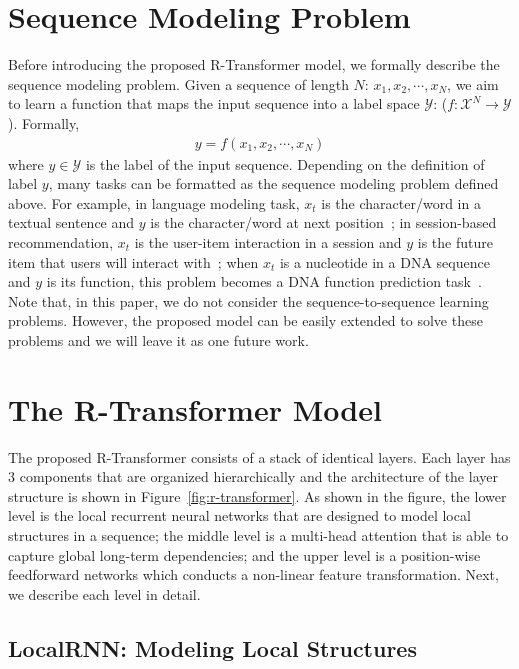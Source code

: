 \documentclass{article} \usepackage{iclr2019_conference,times}
\begin{document}
\section{Sequence Modeling Problem}
Before introducing the proposed R-Transformer model, we formally describe the sequence modeling problem. Given a sequence of length $N$: $x_1, x_2, \cdots, x_N$, we aim to learn a function that maps the input sequence into a label space $\mathcal{Y}$: ($f: \mathcal{X}^N \rightarrow \mathcal{Y}$). Formally, 
\begin{align}
y = f(x_1, x_2, \cdots, x_N)
\end{align}
\noindent where $y \in \mathcal{Y} $ is the label of the input sequence. Depending on the definition of label $y$, many tasks can be formatted as the sequence modeling problem defined above. For example, in language modeling task, $x_t$ is the character/word in a textual sentence and $y$ is the character/word at next position~\citep{mikolov2010recurrent}; in session-based recommendation, $x_t$ is the user-item interaction in a session and $y$ is the future item that users will interact with~\citep{hidasi2015session}; when $x_t$ is a nucleotide in a DNA sequence and $y$ is its function, this problem becomes a DNA function prediction task~\citep{quang2016danq}. Note that, in this paper, we do not consider the sequence-to-sequence learning problems. However, the proposed model can be easily extended to solve these problems and we will leave it as one future work.

\section{The R-Transformer Model}
The proposed R-Transformer consists of a stack of identical layers. Each layer has 3 components that are organized hierarchically and the architecture of the layer structure is shown in Figure~\ref{fig:r-transformer}. As shown in the figure, the lower level is the local recurrent neural networks that are designed to model local structures in a sequence; the middle level is a multi-head attention that is able to capture global long-term dependencies; and the upper level is a position-wise feedforward networks which conducts a non-linear feature transformation. Next, we describe each level in detail.

\subsection{LocalRNN: Modeling Local Structures}
\end{document}
